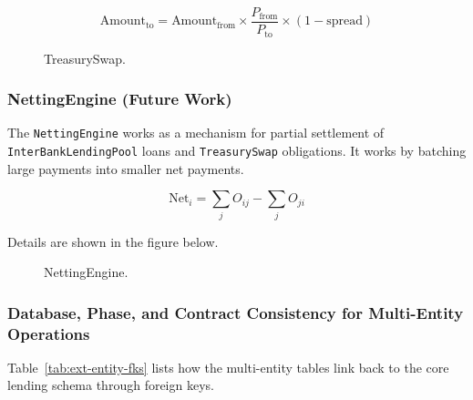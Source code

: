 \[
\text{Amount}_{\text{to}} = \text{Amount}_{\text{from}} \times \frac{P_{\text{from}}}{P_{\text{to}}} \times (1 - \text{spread})
\]

\begin{figure}[H]
\centering
{}
\caption[TreasurySwap]{TreasurySwap.}
\label{fig:treasury-swap}
\end{figure}

\subsubsection{NettingEngine (Future Work)}
\label{sec:netting-settlement}

The \texttt{NettingEngine} works as a mechanism for partial settlement of \texttt{InterBankLendingPool} loans and \texttt{TreasurySwap} obligations. It works by batching large payments into smaller net payments.

\[
\text{Net}_i = \sum_{j} O_{ij} - \sum_{j} O_{ji}
\]

Details are shown in the figure below.

\begin{figure}[H]
\centering
{}
\caption[NettingEngine]{NettingEngine.}
\label{fig:netting-engine}
\end{figure}

\subsubsection{Database, Phase, and Contract Consistency for Multi-Entity Operations}
\label{sec:multi-entity-consistency}

Table~\ref{tab:ext-entity-fks} lists how the multi-entity tables link back to the core lending schema through foreign keys.

